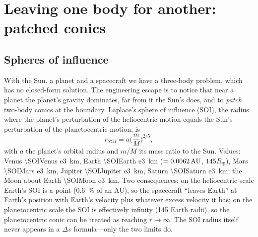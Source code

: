 \documentclass[11pt,letterpaper,oneside]{report}
\newcommand{\dv}{\Delta v}
\begin{document}
\chapter{Leaving one body for another: patched conics}\label{ch:patched}

\section{Spheres of influence}
With the Sun, a planet and a spacecraft we have a three-body problem, which has no closed-form
solution. The engineering escape is to notice that near a planet the planet's gravity dominates,
far from it the Sun's does, and to \emph{patch} two-body conics at the boundary. Laplace's sphere
of influence (SOI), the radius where the planet's perturbation of the heliocentric motion equals
the Sun's perturbation of the planetocentric motion, is
\begin{equation}
  r_{SOI}=a\Big(\frac{m}{M}\Big)^{2/5},
\end{equation}
with $a$ the planet's orbital radius and $m/M$ its mass ratio to the Sun. Values:
Venus \SI{\SOIVenus e3}{km}, Earth \SI{\SOIEarth e3}{km} ($=\SI{0.0062}{AU}$,
$145R_\oplus$), Mars \SI{\SOIMars e3}{km}, Jupiter \SI{\SOIJupiter e3}{km}, Saturn
\SI{\SOISaturn e3}{km}; the Moon about Earth \SI{\SOIMoon e3}{km}. Two consequences:
on the heliocentric scale Earth's SOI is a point (\SI{0.6}{\percent} of an AU), so the
spacecraft ``leaves Earth'' at Earth's position with Earth's velocity plus whatever
excess velocity it has; on the planetocentric scale the SOI is effectively infinity
(\num{145} Earth radii), so the planetocentric conic can be treated as reaching $r\to\infty$.
The SOI radius itself never appears in a $\dv$ formula---only the two limits do.
\end{document}
